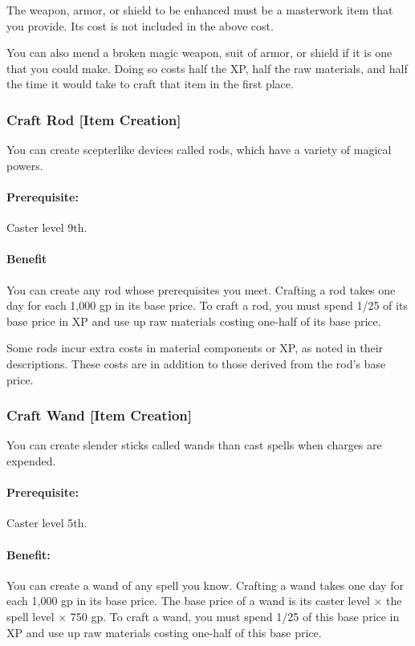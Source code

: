 The weapon, armor, or shield to be enhanced must be a masterwork item that you provide. Its cost is not included in the above cost.

You can also mend a broken magic weapon, suit of armor, or shield if it is one that you could make. Doing so costs half the XP, half the raw materials, and half the time it would take to craft that item in the first place.

\subsubsection[Craft Rod]{Craft Rod [Item Creation]}
\label{Feat:CraftRod}
You can create scepterlike devices called rods, which have a variety of magical powers.

\paragraph{Prerequisite:}
Caster level 9th.

\paragraph{Benefit}
You can create any rod whose prerequisites you meet. 
Crafting a rod takes one day for each 1,000 gp in its base price. 
To craft a rod, you must spend 1/25 of its base price in XP and use up raw materials costing one-half of its base price.

Some rods incur extra costs in material components or XP, as noted in their descriptions. 
These costs are in addition to those derived from the rod’s base price.

\subsubsection[Craft Wand]{Craft Wand [Item Creation]}
\label{Feat:CraftWand}
You can create slender sticks called wands than cast spells when charges are expended.

\paragraph{Prerequisite:}
Caster level 5th.

\paragraph{Benefit:}
You can create a wand of any spell you know. %
Crafting a wand takes one day for each 1,000 gp in its base price. 
The base price of a wand is its caster level $\times$ the spell level $\times$ 750 gp. 
To craft a wand, you must spend 1/25 of this base price in XP and use up raw materials costing one-half of this base price.

